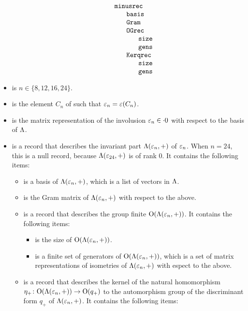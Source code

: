 \documentclass{amsart} %
\newcommand{\ttbox}[1]{\makebox[0pt][l]{{\tt #1}}}
\newcommand{\pt}{p{.2cm}}
\begin{document}
\begin{itemize}
\[{\begin{tabular}{\pt \pt \pt \pt}
%
& \ttbox{minusrec} && \\
&& \ttbox{basis} & \\
&& \ttbox{Gram} & \\
&& \ttbox{OGrec} & \\
&&& \ttbox{size}  \\
&&& \ttbox{gens}  \\
&& \ttbox{Kerqrec} & \\
&&& \ttbox{size}  \\
&&& \ttbox{gens}  \\
\end{tabular}
}
\]
%
%
\begin{itemize}
%
\item {} is $n\in \{8, 12, 16, 24\}$.
%
\item {} is the  element $C_n$ of  such that $\varepsilon_n=\varepsilon(C_n)$.
%
\item {} is the matrix representation of the involusion $\varepsilon_n\in \cdot 0$
with respect to the basis   of $\Lambda$.
%
\item {}  
is a record that describes the invariant part $\Lambda(\varepsilon_n, +)$ of $\varepsilon_n$.
When $n=24$, this is a null record, because $\Lambda(\varepsilon_{24}, +)$ is of rank $0$.
It contains the following items:
%
\begin{itemize}
\item {}
is a basis of $\Lambda(\varepsilon_n, +)$,
which is a list of  vectors in $\Lambda$.
\item {}
is the Gram matrix of $\Lambda(\varepsilon_n, +)$
with respect to the  above.
%
\item {}
is a record that describes the group finite $\mathord{\mathrm{O}}(\Lambda(\varepsilon_n, +))$.
It contains the following items:
%
\begin{itemize}
\item {} is the size of $\mathord{\mathrm{O}}(\Lambda(\varepsilon_n, +))$.
\item {} is a finite set of generators of $\mathord{\mathrm{O}}(\Lambda(\varepsilon_n, +))$,
which is a set of matrix representations of isometries of $\Lambda(\varepsilon_n, +)$ 
with espect to the  above.
\end{itemize}
%
\item {}
is a record that describes the kernel of 
the natural homomorphism  ${\eta}_{+}\colon \mathord{\mathrm{O}}(\Lambda(\varepsilon_n, +))\to \mathord{\mathrm{O}}(q_+)$
to the automorphism group of the discriminant form  $q_+$ of $\Lambda(\varepsilon_n, +)$.
It contains the following items:
%
\begin{itemize}

\end{itemize}
\end{itemize}
\end{itemize}
\end{itemize}
\end{document}
